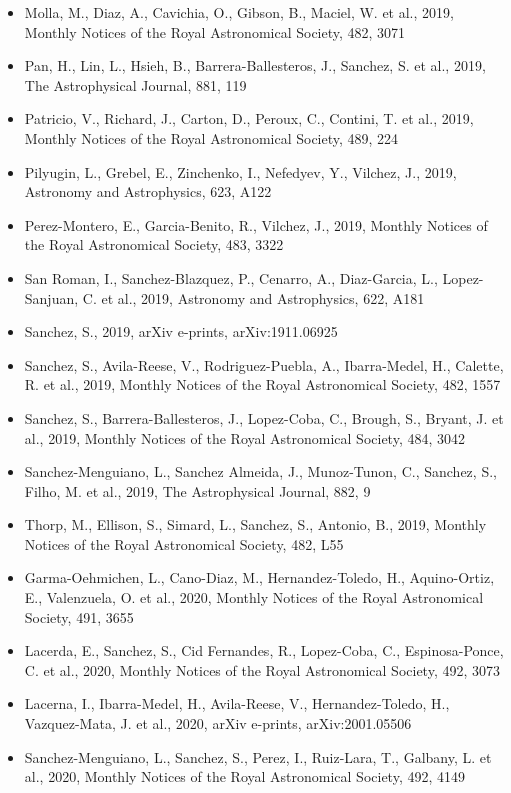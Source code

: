 \documentclass{letter}
\begin{document}
\begin{enumerate}
\begin{itemize}
\item Molla, M., Diaz, A., Cavichia, O., Gibson, B., Maciel, W. et al., 2019, Monthly Notices of the Royal Astronomical Society, 482, 3071
\item Pan, H., Lin, L., Hsieh, B., Barrera-Ballesteros, J., Sanchez, S. et al., 2019, The Astrophysical Journal, 881, 119
\item Patricio, V., Richard, J., Carton, D., Peroux, C., Contini, T. et al., 2019, Monthly Notices of the Royal Astronomical Society, 489, 224
\item Pilyugin, L., Grebel, E., Zinchenko, I., Nefedyev, Y., Vilchez, J., 2019, Astronomy and Astrophysics, 623, A122
\item Perez-Montero, E., Garcia-Benito, R., Vilchez, J., 2019, Monthly Notices of the Royal Astronomical Society, 483, 3322
\item San Roman, I., Sanchez-Blazquez, P., Cenarro, A., Diaz-Garcia, L., Lopez-Sanjuan, C. et al., 2019, Astronomy and Astrophysics, 622, A181
\item Sanchez, S., 2019, arXiv e-prints, arXiv:1911.06925
\item Sanchez, S., Avila-Reese, V., Rodriguez-Puebla, A., Ibarra-Medel, H., Calette, R. et al., 2019, Monthly Notices of the Royal Astronomical Society, 482, 1557
\item Sanchez, S., Barrera-Ballesteros, J., Lopez-Coba, C., Brough, S., Bryant, J. et al., 2019, Monthly Notices of the Royal Astronomical Society, 484, 3042
\item Sanchez-Menguiano, L., Sanchez Almeida, J., Munoz-Tunon, C., Sanchez, S., Filho, M. et al., 2019, The Astrophysical Journal, 882, 9
\item Thorp, M., Ellison, S., Simard, L., Sanchez, S., Antonio, B., 2019, Monthly Notices of the Royal Astronomical Society, 482, L55
\item Garma-Oehmichen, L., Cano-Diaz, M., Hernandez-Toledo, H., Aquino-Ortiz, E., Valenzuela, O. et al., 2020, Monthly Notices of the Royal Astronomical Society, 491, 3655
\item Lacerda, E., Sanchez, S., Cid Fernandes, R., Lopez-Coba, C., Espinosa-Ponce, C. et al., 2020, Monthly Notices of the Royal Astronomical Society, 492, 3073
\item Lacerna, I., Ibarra-Medel, H., Avila-Reese, V., Hernandez-Toledo, H., Vazquez-Mata, J. et al., 2020, arXiv e-prints, arXiv:2001.05506
\item Sanchez-Menguiano, L., Sanchez, S., Perez, I., Ruiz-Lara, T., Galbany, L. et al., 2020, Monthly Notices of the Royal Astronomical Society, 492, 4149

\end{itemize}
\end{enumerate}
\end{document}
